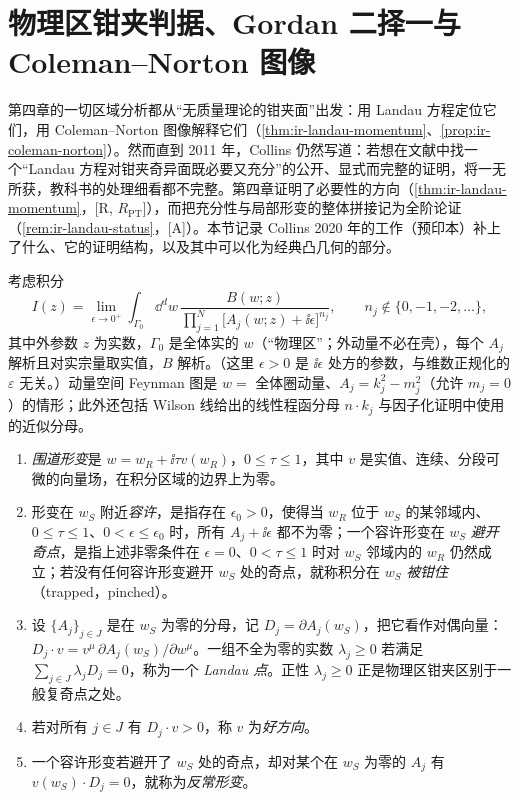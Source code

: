 \section{物理区钳夹判据、Gordan 二择一与 Coleman--Norton 图像}\label{sec:front-landau}

第四章的一切区域分析都从“无质量理论的钳夹面”出发：用 Landau 方程定位它们，用 Coleman--Norton 图像解释它们（\cref{thm:ir-landau-momentum}、\cref{prop:ir-coleman-norton}）。然而直到 2011 年，Collins 仍然写道：若想在文献中找一个“Landau 方程对钳夹奇异面既必要又充分”的公开、显式而完整的证明，将一无所获，教科书的处理细看都不完整\cite[第~5.4.3~节，第~110~页]{Collins2011}。第四章证明了必要性的方向（\cref{thm:ir-landau-momentum}，[R, $R_{\mathrm{PT}}$]），而把充分性与局部形变的整体拼接记为全阶论证（\cref{rem:ir-landau-status}，[A]）。本节记录 Collins 2020 年的工作\cite{Collins:2020euz}（预印本）补上了什么、它的证明结构，以及其中可以化为经典凸几何的部分。

\begin{definition}\label{def:front-trap}
考虑积分
\begin{equation}\label{eq:front-collins-integral}
I(z)=\lim_{\epsilon\to0^+}\int_{\Gamma_0}\dd^dw\,\frac{B(w;z)}{\prod_{j=1}^N\bigl[A_j(w;z)+\ii\epsilon\bigr]^{n_j}},\qquad n_j\notin\{0,-1,-2,\dots\},
\end{equation}
其中外参数 $z$ 为实数，$\Gamma_0$ 是全体实的 $w$（“物理区”；外动量不必在壳），每个 $A_j$ 解析且对实宗量取实值，$B$ 解析。（这里 $\epsilon>0$ 是 $\ii\epsilon$ 处方的参数，与维数正规化的 $\varepsilon$ 无关。）动量空间 Feynman 图是 $w=$ 全体圈动量、$A_j=k_j^2-m_j^2$（允许 $m_j=0$）的情形；此外还包括 Wilson 线给出的线性程函分母 $n\cdot k_j$ 与因子化证明中使用的近似分母。
\begin{enumerate}[label=(\roman*),leftmargin=2.2em,itemsep=1pt,topsep=2pt]
\item \emph{围道形变}是 $w=w_R+\ii\tau v(w_R)$，$0\le\tau\le1$，其中 $v$ 是实值、连续、分段可微的向量场，在积分区域的边界上为零。
\item 形变在 $w_S$ 附近\emph{容许}，是指存在 $\epsilon_0>0$，使得当 $w_R$ 位于 $w_S$ 的某邻域内、$0\le\tau\le1$、$0<\epsilon\le\epsilon_0$ 时，所有 $A_j+\ii\epsilon$ 都不为零；一个容许形变在 $w_S$ \emph{避开奇点}，是指上述非零条件在 $\epsilon=0$、$0<\tau\le1$ 时对 $w_S$ 邻域内的 $w_R$ 仍然成立；若没有任何容许形变避开 $w_S$ 处的奇点，就称积分在 $w_S$ \emph{被钳住}（trapped，pinched）。
\item 设 $\{A_j\}_{j\in J}$ 是在 $w_S$ 为零的分母，记 $D_j=\partial A_j(w_S)$，把它看作对偶向量：$D_j\cdot v=v^\mu\,\partial A_j(w_S)/\partial w^\mu$。一组不全为零的实数 $\lambda_j\ge0$ 若满足 $\sum_{j\in J}\lambda_jD_j=0$，称为一个 \emph{Landau 点}。正性 $\lambda_j\ge0$ 正是物理区钳夹区别于一般复奇点之处。
\item 若对所有 $j\in J$ 有 $D_j\cdot v>0$，称 $v$ 为\emph{好方向}。
\item 一个容许形变若避开了 $w_S$ 处的奇点，却对某个在 $w_S$ 为零的 $A_j$ 有 $v(w_S)\cdot D_j=0$，就称为\emph{反常形变}。
\end{enumerate}
\end{definition}

